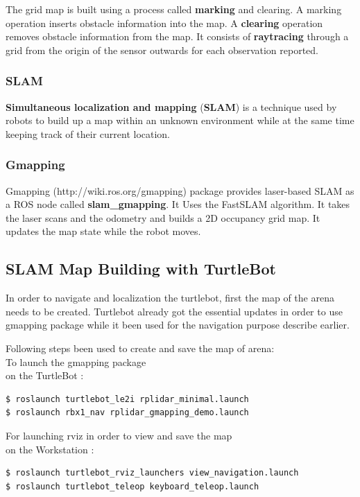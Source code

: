 \documentclass[10pt,a4paper]{article}
\begin{document}
The grid map is built using a process called \textbf{marking} and clearing. A marking operation inserts obstacle information into the map. A \textbf{clearing} operation removes obstacle information from the map. It consists of \textbf{raytracing} through a grid from the origin of the sensor outwards for each observation reported.

\subsubsection{SLAM}
\textbf{Simultaneous localization and mapping} (\textbf{SLAM}) is a technique used by robots to build up a map within an unknown environment while at the same time keeping track of their current location.

\subsubsection{Gmapping}
Gmapping (http://wiki.ros.org/gmapping) package provides laser-based SLAM as a ROS node called \textbf{slam\_gmapping}. It Uses the FastSLAM algorithm. It takes the laser scans and the odometry and builds a 2D occupancy grid map. It updates the map state while the robot moves.

\subsection{SLAM Map Building with TurtleBot}

In order to navigate and localization the turtlebot, first the map of the arena needs to be created. Turtlebot already got the essential updates in order to use gmapping package while it been used for the navigation purpose describe earlier.

Following steps been used to create and save the map of arena:\\
To launch the gmapping package\\
on the TurtleBot :
\begin{lstlisting}[frame=single] 
$ roslaunch turtlebot_le2i rplidar_minimal.launch
$ roslaunch rbx1_nav rplidar_gmapping_demo.launch
\end{lstlisting}

For launching rviz in order to view and save the map\\
on the Workstation :
\begin{lstlisting}[frame=single] 
$ roslaunch turtlebot_rviz_launchers view_navigation.launch
$ roslaunch turtlebot_teleop keyboard_teleop.launch
\end{lstlisting}
\end{document}
